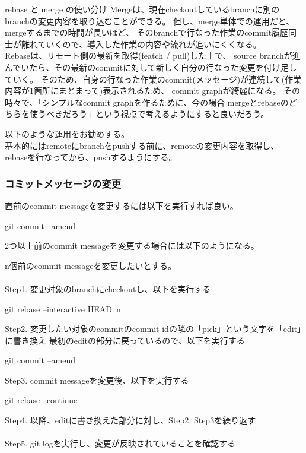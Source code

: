 \documentclass[10pt,a4j,openany,dvipdfmx]{jsarticle}
\begin{document}
\begin{oceanbox}{rebase と merge の使い分け}
Mergeは、現在checkoutしているbranchに別のbranchの変更内容を取り込むことができる。
但し、merge単体での運用だと、mergeするまでの時間が長いほど、
そのbranchで行なった作業のcommit履歴同士が離れていくので、導入した作業の内容や流れが追いにくくなる。\\
Rebaseは、リモート側の最新を取得(featch / pull)した上で、
source branchが進んでいたら、その最新のcommitに対して新しく自分の行なった変更を付け足していく。
そのため、自身の行なった作業のcommit(メッセージ)が連続して(作業内容が1箇所にまとまって)表示されるため、
commit graphが綺麗になる。
\tcblower
その時々で、「シンプルなcommit graphを作るために、今の場合
mergeとrebaseのどちらを使うべきだろう」という視点で考えるようにすると良いだろう。
\end{oceanbox}

以下のような運用をお勧めする。\\
基本的にはremoteにbranchをpushする前に、remoteの変更内容を取得し、
rebaseを行なってから、pushするようにする。


\subsubsection{コミットメッセージの変更} %
\label{ssub:コミットメッセージの変更}

直前のcommit messageを変更するには以下を実行すれば良い。
\begin{commandshell}
git commit --amend
\end{commandshell}

2つ以上前のcommit messageを変更する場合には以下のようになる。

\begin{tcolorbox}[skin=enhanced,
left=3mm,right=3mm,top=1mm,bottom=1mm, boxrule=1.0mm, 
title=2つ以上前のcommit messageの変更, coltitle=black, fonttitle=\bfseries, 
colback=SpringGreen!5!white,colframe=SpringGreen!70]
n個前のcommit messageを変更したいとする。\\
\\
Step1. 変更対象のbranchにcheckoutし、以下を実行する
\begin{commandshell}
git rebase --interactive HEAD~n
\end{commandshell}

Step2. 変更したい対象のcommitのcommit idの隣の「pick」という文字を「edit」に書き換え
最初のeditの部分に戻っているので、以下を実行する
\begin{commandshell}
git commit --amend
\end{commandshell}

Step3. commit messageを変更後、以下を実行する
\begin{commandshell}
git rebase --continue
\end{commandshell}

Step4. 以降、editに書き換えた部分に対し、Step2, Step3を繰り返す\\
\\
Step5. git logを実行し、変更が反映されていることを確認する
\end{tcolorbox}
\end{document}
